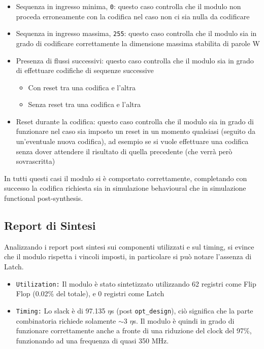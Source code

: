 \documentclass{article}
\begin{document}
\begin{itemize}
    \item Sequenza in ingresso minima, \texttt{0}: questo caso controlla che il modulo non proceda erroneamente con la codifica nel caso non ci sia nulla da codificare
    \item Sequenza in ingresso massima, \texttt{255}: questo caso controlla che il modulo sia in grado di codificare correttamente la dimensione massima stabilita di parole W
    \item Presenza di flussi successivi: questo caso controlla che il modulo sia in grado di effettuare codifiche di sequenze successive
    \begin{itemize}
        \item Con reset tra una codifica e l'altra
        \item Senza reset tra una codifica e l'altra
    \end{itemize}
    \item Reset durante la codifica: questo caso controlla che il modulo sia in grado di funzionare nel caso sia imposto un reset in un momento qualsiasi (seguito da un'eventuale nuova codifica), ad esempio se si vuole effettuare una codifica senza dover attendere il risultato di quella precedente (che verrà però sovrascritta)
\end{itemize}

In tutti questi casi il modulo si è comportato correttamente, completando con successo la codifica richiesta sia in simulazione behavioural che in simulazione functional post-synthesis.

\subsection{Report di Sintesi}
Analizzando i report post sintesi sui componenti utilizzati e sul timing, si evince che il modulo rispetta i vincoli imposti, in particolare si può notare l'assenza di Latch.

\begin{itemize}
    \item \texttt{Utilization:} Il modulo è stato sintetizzato utilizzando 62 registri come Flip Flop (0.02\% del totale), e 0 registri come Latch
    \item \texttt{Timing:} Lo slack è di 97.135 $\eta$s (post \texttt{opt\_design}), ciò significa che la parte combinatoria richiede solamente $\sim$3 $\eta$s. Il modulo è quindi in grado di funzionare correttamente anche a fronte di una riduzione del clock del 97\%, funzionando ad una frequenza di quasi 350 MHz.
\end{itemize}
\end{document}
